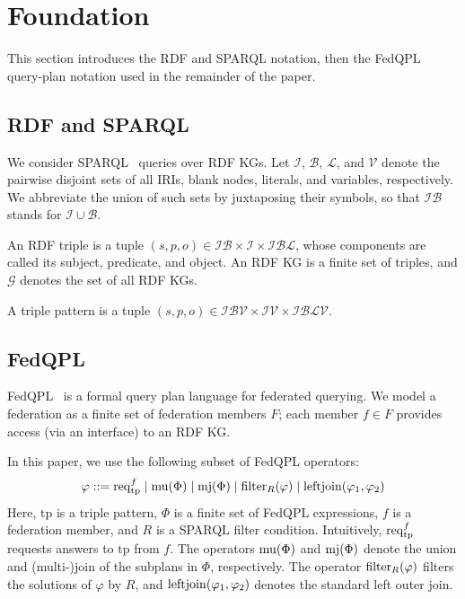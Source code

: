 \section{Foundation}

This section introduces the \ac{RDF} and SPARQL notation, then the FedQPL query-plan notation used in the remainder of the paper.

\subsection{RDF and SPARQL}

We consider SPARQL~\cite{w3SPARQLQuery} queries over \ac{RDF} \acp{KG}.
Let $\mathcal{I}$, $\mathcal{B}$, $\mathcal{L}$, and $\mathcal{V}$ denote the pairwise disjoint sets of all \acp{IRI}, blank nodes, literals, and variables, respectively.
We abbreviate the union of such sets by juxtaposing their symbols, so that $\mathcal{I}\mathcal{B}$ stands for $\mathcal{I} \cup \mathcal{B}$.

\begin{definition}[Triple]\label{def:triple}
An \ac{RDF} triple is a tuple $(s, p, o) \in \mathcal{I}\mathcal{B} \times \mathcal{I} \times \mathcal{I}\mathcal{B}\mathcal{L}$,
whose components are called its subject, predicate, and object.
An \ac{RDF} \ac{KG} is a finite set of triples, and $\mathcal{G}$ denotes the set of all \ac{RDF} \acp{KG}.
\end{definition}

\begin{definition}\label{def:triple-pattern}
A triple pattern is a tuple $(s, p, o) \in \mathcal{I}\mathcal{B}\mathcal{V} \times \mathcal{I}\mathcal{V} \times \mathcal{I}\mathcal{B}\mathcal{L}\mathcal{V}$.
\end{definition}

\subsection{FedQPL}

FedQPL~\cite{cheng2020fedqpl} is a formal query plan language for federated querying.
We model a federation as a finite set of federation members $F$; each member $f \in F$ provides access (via an interface) to an RDF \ac{KG}.

In this paper, we use the following subset of FedQPL operators:
\[
  \varphi ::= \operatorname{req}_{\mathrm{tp}}^{f} \mid \operatorname{mu}(\Phi) \mid \operatorname{mj}(\Phi) \mid \operatorname{filter}_{R}(\varphi) \mid \operatorname{leftjoin}(\varphi_1, \varphi_2)
\]
Here, $\mathrm{tp}$ is a triple pattern, $\Phi$ is a finite set of FedQPL expressions, $f$ is a federation member, and $R$ is a SPARQL filter condition.
Intuitively, $\operatorname{req}_{\mathrm{tp}}^{f}$ requests answers to $\mathrm{tp}$ from $f$.
The operators $\operatorname{mu}(\Phi)$ and $\operatorname{mj}(\Phi)$ denote the union and (multi-)join of the subplans in $\Phi$, respectively.
The operator $\operatorname{filter}_{R}(\varphi)$ filters the solutions of $\varphi$ by $R$, and $\operatorname{leftjoin}(\varphi_1, \varphi_2)$ denotes the standard left outer join.

